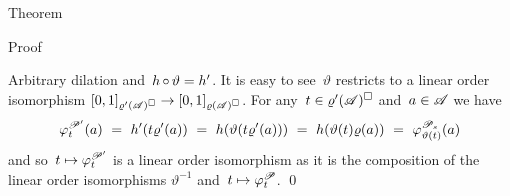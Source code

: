 \documentclass[b]{subfiles}
\begin{document}
\begin{parsec}
\begin{point}{Theorem}
\begin{point}{Proof}
\begin{point}{Arbitrary dilation}
    and~$h \mathop{\circ} \vartheta = h'$.
It is easy to see~$\vartheta$ restricts to a linear order isomorphism
    $[0,1]_{\varrho'(\mathscr{A})^\square} \to [0,1]_{\varrho(\mathscr{A})^\square}$.
For any~$t \in \varrho'(\mathscr{A})^\square$ and~$a\in \mathscr{A}$ we have
\begin{equation*}
    \varphi_t^{\mathscr{P}'} (a)
        \ = \ h'(t \varrho'(a))
        \ = \ h(\vartheta(t \varrho'(a)))
        \ = \ h(\vartheta(t) \varrho(a))
        \ = \ \varphi_{\vartheta(t)}^{\mathscr{P}_s}(a)
\end{equation*}
and so~$t \mapsto \varphi_t^{\mathscr{P}'}$
    is a linear order isomorphism as it
    is the composition of the linear order isomorphisms
    $\vartheta^{-1}$ and~$t \mapsto \varphi_t^{\mathscr{P}}$. \qed
\end{point}
\end{point}
\end{point}
\end{parsec}
\end{document}
